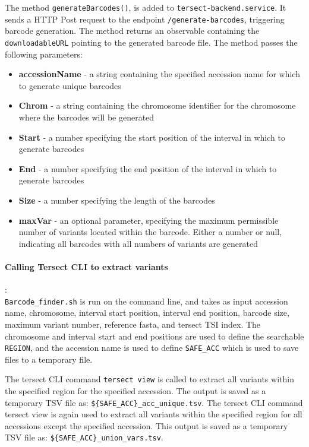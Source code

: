 \documentclass[12pt]{article}
\begin{document}
\begin{itemize}
The method \verb+generateBarcodes()+, is added to \verb+tersect-backend.service+. It sends a HTTP Post request to the endpoint \verb+/generate-barcodes+, triggering barcode generation. The method returns an observable containing the \verb+downloadableURL+ pointing to the generated barcode file. The method passes the following parameters: 
\begin{itemize}
    \item \textbf{accessionName} - a string containing the specified accession name for which to generate unique barcodes 
    \item \textbf{Chrom} - a string containing the chromosome identifier for the chromosome where the barcodes will be generated 
    \item \textbf{Start} - a number specifying the start position of the interval in which to generate barcodes 
    \item \textbf{End} - a number specifying the end position of the interval in which to generate barcodes 
    \item \textbf{Size} - a number specifying the length of the barcodes 
    \item \textbf{maxVar} - an optional parameter, specifying the maximum permissible number of variants located within the barcode. Either a number or null, indicating all barcodes with all numbers of variants are generated
\end{itemize}


\paragraph{Calling Tersect CLI to extract variants}: \\
\verb+Barcode_finder.sh+ is run on the command line, and takes as input accession name, chromosome, interval start position, interval end position, barcode size, maximum variant number, reference fasta, and tersect TSI index. The chromosome and interval start and end positions are used to define the searchable \verb+REGION+, and the accession name is used to define \verb+SAFE_ACC+ which is used to save files to a temporary file.  

The tersect CLI command \verb+tersect view+  is called to extract all variants within the specified region for the specified accession. The output is saved as a temporary TSV file as: \verb+${SAFE_ACC}_acc_unique.tsv+. The tersect CLI command tersect view is again used to extract all variants within the specified region for all accessions except the specified accession. This output is saved as a temporary TSV file as: \verb+${SAFE_ACC}_union_vars.tsv+.  


\end{itemize}
\end{document}
